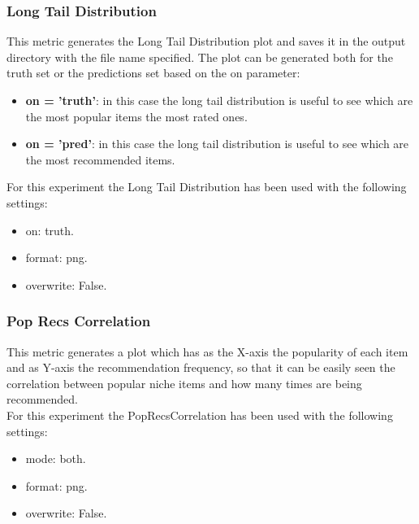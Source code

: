 \documentclass[11pt]{article}
\begin{document}
\subsubsection{Long Tail Distribution}\label{subsubsec:ltd}
This metric generates the Long Tail Distribution plot and saves it in the output directory with the file name
specified.
The plot can be generated both for the truth set or the predictions set based on the on parameter:
\begin{itemize}
    \item \textbf{on = 'truth'}: in this case the long tail distribution is useful to see which are the most popular items
       the most rated ones.
    \item \textbf{on = 'pred'}: in this case the long tail distribution is useful to see which are the most recommended
        items.
\end{itemize}

\hfill\break
For this experiment the Long Tail Distribution has been used with the following settings:
\begin{itemize}
    \item on: truth.
    \item format: png.
    \item overwrite: False.
\end{itemize}
\hfill\break



\subsubsection{Pop Recs Correlation}\label{subsubsec:poprc}
This metric generates a plot which has as the X-axis the popularity of each item and as Y-axis the recommendation
frequency, so that it can be easily seen the correlation between popular niche items and how many times are being
recommended. \\
For this experiment the PopRecsCorrelation has been used with the following settings:
\begin{itemize}
    \item mode: both.
    \item format: png.
    \item overwrite: False.
\end{itemize}
\hfill\break
\end{document}
